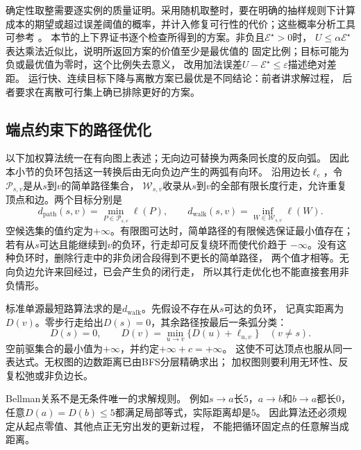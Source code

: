 确定性取整需要逐实例的质量证明。采用随机取整时，要在明确的抽样规则下计算
成本的期望或超过误差阈值的概率，并计入修复可行性的代价；这些概率分析工具可参考
。
本节的上下界证书逐个检查所得到的方案。非负且\(\mathcal E^\star>0\)时，
\(U\leq\alpha\mathcal E^\star\)表达乘法近似比，说明所返回方案的价值至少是最优值的
固定比例；目标可能为负或最优值为零时，这个比例失去意义，
改用加法误差\(U-\mathcal E^\star\leq\varepsilon\)描述绝对差距。
运行快、连续目标下降与离散方案已最优是不同结论：前者讲求解过程，
后者要求在离散可行集上确已排除更好的方案。

\subsection{端点约束下的路径优化}
\label{sec:graph-theory-shortest-paths}

以下加权算法统一在有向图上表述；无向边可替换为两条同长度的反向弧。
因此本小节的负环包括这一转换后由无向负边产生的两弧有向环。
沿用边长\(\ell_e\)，令\(\mathcal P_{s,v}\)是从\(s\)到\(v\)的简单路径集合，
\(\mathcal W_{s,v}\)收录从\(s\)到\(v\)的全部有限长度行走，允许重复顶点和边。两个目标分别是
\[
  d_{\mathrm{path}}(s,v)=\min_{P\in\mathcal P_{s,v}}\ell(P),
  \qquad
  d_{\mathrm{walk}}(s,v)=\inf_{W\in\mathcal W_{s,v}}\ell(W).
\]
空候选集的值约定为\(+\infty\)。有限图可达时，简单路径的有限候选保证最小值存在；
若有从\(s\)可达且能继续到\(v\)的负环，行走却可反复绕环而使代价趋于
\(-\infty\)。没有这种负环时，删除行走中的非负闭合段得到不更长的简单路径，
两个值才相等。无向负边允许来回经过，已会产生负的闭行走，
所以其行走优化也不能直接套用非负情形。

标准单源最短路算法求的是\(d_{\mathrm{walk}}\)。先假设不存在从\(s\)可达的负环，
记真实距离为\(D(v)\)。零步行走给出\(D(s)=0\)，其余路径按最后一条弧分类：
\begin{equation}
  D(s)=0,\qquad
  D(v)=\min_{u\to v}\{D(u)+\ell_{u,v}\}\quad(v\neq s).
  \label{eq:graph-theory-shortest-path-bellman}
\end{equation}
空前驱集合的最小值为\(+\infty\)，并约定\(+\infty+c=+\infty\)。
这使不可达顶点也服从同一表达式。无权图的边数距离已由BFS分层精确求出；
加权图则要利用无环性、反复松弛或非负边长。

Bellman关系不是无条件唯一的求解规则。
例如\(s\to a\)长\(5\)，\(a\to b\)和\(b\to a\)都长\(0\)，
任意\(D(a)=D(b)\leq5\)都满足局部等式，实际距离却是\(5\)。
因此算法还必须规定从起点零值、其他点正无穷出发的更新过程，
不能把循环固定点的任意解当成距离。

